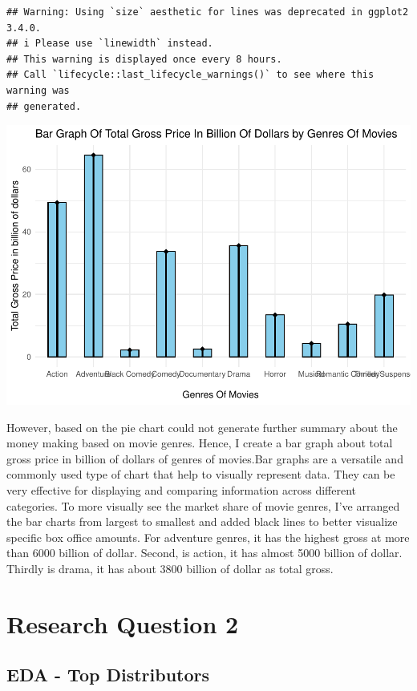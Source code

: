 \documentclass[
]{article}
\begin{document}
\begin{verbatim}
## Warning: Using `size` aesthetic for lines was deprecated in ggplot2 3.4.0.
## i Please use `linewidth` instead.
## This warning is displayed once every 8 hours.
## Call `lifecycle::last_lifecycle_warnings()` to see where this warning was
## generated.
\end{verbatim}

\includegraphics{Final-project_files/figure-latex/unnamed-chunk-2-1.pdf}

However, based on the pie chart could not generate further summary about
the money making based on movie genres. Hence, I create a bar graph
about total gross price in billion of dollars of genres of movies.Bar
graphs are a versatile and commonly used type of chart that help to
visually represent data. They can be very effective for displaying and
comparing information across different categories. To more visually see
the market share of movie genres, I've arranged the bar charts from
largest to smallest and added black lines to better visualize specific
box office amounts. For adventure genres, it has the highest gross at
more than 6000 billion of dollar. Second, is action, it has almost 5000
billion of dollar. Thirdly is drama, it has about 3800 billion of dollar
as total gross.

\hypertarget{research-question-2}{%
\section{Research Question 2}\label{research-question-2}}

\hypertarget{eda---top-distributors}{%
\subsection{EDA - Top Distributors}\label{eda---top-distributors}}
\end{document}
